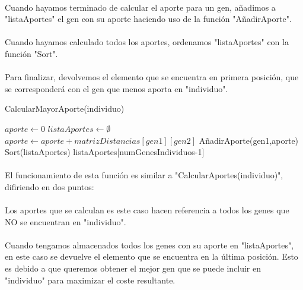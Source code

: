	\paragraph{}Cuando hayamos terminado de calcular el aporte para un gen, añadimos a "listaAportes" el gen con su aporte haciendo uso de la función "AñadirAporte".
	
	\paragraph{}Cuando hayamos calculado todos los aportes, ordenamos "listaAportes" con la función "Sort".
	
	\paragraph{}Para finalizar, devolvemos el elemento que se encuentra en primera posición, que se corresponderá con el gen que menos aporta en "individuo".
	
	\begin{algorithm}[H]
		\caption{CalcularMayorAporte(individuo)}
		\begin{algorithmic}
			\STATE $aporte \leftarrow 0$
			\STATE $listaAportes \leftarrow \emptyset$
			\STATE $aporte \leftarrow aporte + matrizDistancias[gen1][gen2]$
			\ENDFOR
			\STATE AñadirAporte(gen1,aporte)
			\ENDFOR
			\STATE Sort(listaAportes)
			\RETURN listaAportes[numGenesIndividuos-1]	
		\end{algorithmic}
	\end{algorithm}

	\paragraph{}El funcionamiento de esta función es similar a "CalcularAportes(individuo)", difiriendo en dos puntos:
	
	\paragraph{}Los aportes que se calculan es este caso hacen referencia a todos los genes que NO se encuentran en "individuo".
	
	\paragraph{}Cuando tengamos almacenados todos los genes con su aporte en "listaAportes", en este caso se devuelve el elemento que se encuentra en la última posición. Esto es debido a que queremos obtener el mejor gen que se puede incluir en "individuo" para maximizar el coste resultante.

